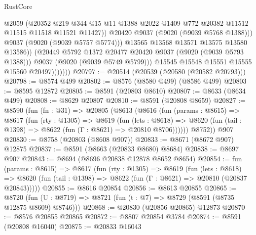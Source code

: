 \begin{lexlean}{RustCore}
\begin{coremodule}
                              @2059
                              (@20352
                                @219
                                @344
                                @15
                                @11
                                @1388
                                @2022
                                @1409
                                @772
                                @20382
                                @11512
                                @11515
                                @11518
                                @11521
                                @11427))
                            @20420
                            @9037
                            (@9020 (@9039 @5768 @1388)))
                          @9037
                          (@9020 (@9039 @5757 @5774)))
                        @13565
                        @13568
                        @13571
                        @13575
                        @13580
                        @13586))
                    (@20449 @5792 @1372 @20477 @20420 @9037 (@9020 (@9039 @5793 @1388)))
                    @9037
                    (@9020 (@9039 @5749 @5799)))
                  @15545
                  @15548
                  @15551
                  @15555
                  @15560
                  @20497)))))))
@20797 := @20514 (@20539 (@20580 (@20582 @20793)))
@20798 := @8574 @499
@20802 := @8576 (@8580 @499) (@8586 @499)
@20803 := @8595 @12872
@20805 := @8591 (@20803 @8610)
@20807 := @8633 (@8634 @499)
@20808 := @8629 @20807
@20810 := @8591 (@20808 @8659)
@20827 := @8590
    (fun (fn : @31) =>
    @20805
      (@8613
        (@8616
          (fun (params : @8615) =>
          @8617
            (fun (rty : @1305) =>
            @8619
              (fun (lets : @8618) =>
              @8620 (fun (tail : @1398) => @8622 (fun (Γ : @8621) => @20810 @8706))))))
        @8752))
    @907
@20830 := @8758 (@20803 (@8608 @907))
@20833 := @8671 (@8672 @907) @12875
@20837 := @8591 (@8663 (@20833 @8680) @8684)
@20838 := @8697 @907
@20843 := @8694 (@8696 @20838 @12878 @8652 @8654)
@20854 := fun (params : @8615) =>
  @8617
    (fun (rty : @1305) =>
    @8619
      (fun (lets : @8618) =>
      @8620 (fun (tail : @1398) => @8622 (fun (Γ : @8621) => @20810 (@20837 @20843)))))
@20855 := @8616 @20854
@20856 := @8613 @20855
@20865 := @8720
    (fun (U : @8719) => @8721 (fun (t : @7) => @8729 (@8591 (@8735 @12875 @8609) @8746)))
@20868 := @20830 (@20856 @20865) @12873
@20870 := @8576 @20855 @20865
@20872 := @8807 @20854 @3784
@20874 := @8591 (@20808 @16040)
@20875 := @20833 @16043

\end{coremodule}
\end{lexlean}
